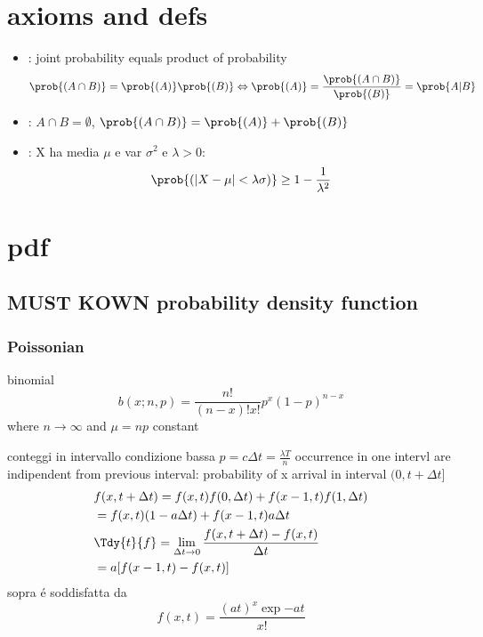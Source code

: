 \chapter{axioms and defs}
\begin{itemize}
\item {}: joint probability equals product of probability
\[\prob{(A\cap B)}=\prob{(A)}\prob{(B)}\Leftrightarrow \prob{(A)}=\frac{\prob{(A\cap B)}}{\prob{(B)}}=\prob{A|B}\]
\item {}: $A\cap B=\emptyset$, $\prob{(A\cap B)}=\prob{(A)}+\prob{(B)}$
\item {}: X ha media $\mu$ e var $\sigma^2$ e $\lambda>0$:
\[\prob{(|X-\mu|<\lambda\sigma)}\geq1-\frac{1}{\lambda^2}\]

\end{itemize}

\chapter{pdf}

\section{MUST KOWN probability density function}

\subsection{Poissonian}

\begin{itemize*}
\item binomial
\[b(x;n,p)=\frac{n!}{(n-x)!x!}p^x(1-p)^{n-x}\]
where $n\to\infty$ and $\mu=np$ constant

\item conteggi in intervallo condizione bassa $p=c\Delta t=\frac{\lambda T}{n}$ occurrence in one intervl are indipendent from previous interval: probability of x arrival in interval $(0,t+\Delta t]$
\begin{align*}
&f(x,t+\Delta t)=f(x,t)f(0,\Delta t)+f(x-1,t)f(1,\Delta t)\\
&=f(x,t)(1-a\Delta t)+f(x-1,t)a\Delta t\\
&\Tdy{t}{f}=\lim_{\Delta t\to0}\frac{f(x,t+\Delta t)-f(x,t)}{\Delta t}\\
&=a[f(x-1,t)-f(x,t)]
\end{align*}
sopra \'e soddisfatta da
\[f(x,t)=\frac{(at)^x\exp{-at}}{x!}\]
\end{itemize*}
